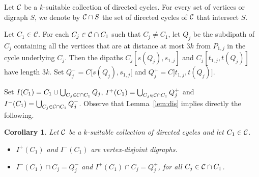 \documentclass[utf8,10pt]{article}
\theoremstyle{plain}
\newtheorem{corollary}[theorem]{Corollary}
\theoremstyle{definition}
\theoremstyle{remark}
\begin{document}




 

Let ${\cal C}$ be a $k$-suitable collection of directed cycles.
For every set of vertices or digraph $S$, we denote by ${\cal C}\cap S$ the set of directed cycles of ${\cal C}$ that intersect $S$. 



Let $C_1\in \mathcal{C}$.
For each $C_j\in {\cal C} \cap C_1$ such that $C_j\neq C_1$, let $Q_j$ be the subdipath of $C_j$ 
containing all the vertices that are at distance at most $3k$ from $P_{1,j}$ in the cycle underlying $C_j$.
Then the dipaths $C_j[s(Q_j), s_{1,j}]$ and  $C_j[t_{1,j},t (Q_j)]$ have length $3k$.
Set $Q^-_j=C[s(Q_j), s_{1,j}[$ and $Q^+_j=C]t_{1,j}, t(Q_j)]$.


Set  $I(C_1) =C_1\cup \bigcup_{C_j\in {\cal C}\cap C_1} Q_j$, $I^+(C_1) = \bigcup_{C_j\in {\cal C}\cap C_1} Q^+_j$ and $I^-(C_1) = \bigcup_{C_j\in {\cal C}\cap C_1} Q^-_j$.
Observe that Lemma~\ref{lem:dis} implies directly the following.
\begin{corollary}\label{cor:util}
Let ${\cal C}$ be a $k$-suitable collection of directed cycles and let $C_1\in {\cal C}$.
\begin{itemize}
\item[(i)]  $I^+(C_1)$ and $I^-(C_1)$ are vertex-disjoint digraphs. 
\item[(ii)] $I^-(C_1) \cap C_j = Q^-_j$ and $I^+(C_1) \cap C_j = Q^+_j$, for all $C_j\in {\cal C}\cap C_1$.
\end{itemize}
 \end{corollary}
\end{document}

